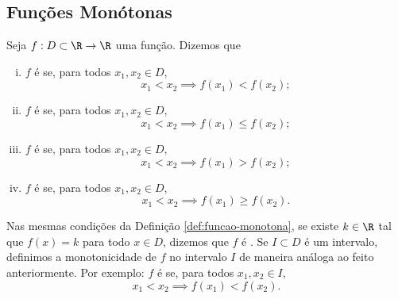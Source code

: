 \subsection{Funções Monótonas}

\begin{definition}
\label{def:funcao-monotona}
    Seja $f: D \subset \R \to \R$ uma função. Dizemos que
\begin{enumerate}[(i)]
  \item $f$ é  se, para todos $x_1, x_2 \in D$,
  $$x_1 < x_2 \implies f(x_1) < f(x_2);$$
  \item $f$ é  se, para todos $x_1, x_2 \in D$,
  $$x_1 < x_2 \implies f(x_1) \leq f(x_2);$$
  \item $f$ é  se, para todos $x_1, x_2 \in D$,
  $$x_1 < x_2 \implies f(x_1) > f(x_2);$$
  \item $f$ é  se, para todos $x_1, x_2 \in D$,
  $$x_1 < x_2 \implies f(x_1) \geq f(x_2).$$
\end{enumerate}
\end{definition}

Nas mesmas condições da Definição \ref{def:funcao-monotona}, se existe $k \in \R$ tal que $f(x) = k$ para todo $x \in D$, dizemos que $f$ é .
Se $I \subset D$ é um intervalo, definimos a monotonicidade de $f$
no intervalo $I$ de maneira análoga ao feito anteriormente. Por
exemplo:
$f$ é  se, para todos
$x_1, x_2 \in I$,
  $$x_1 < x_2 \implies f(x_1) < f(x_2).$$